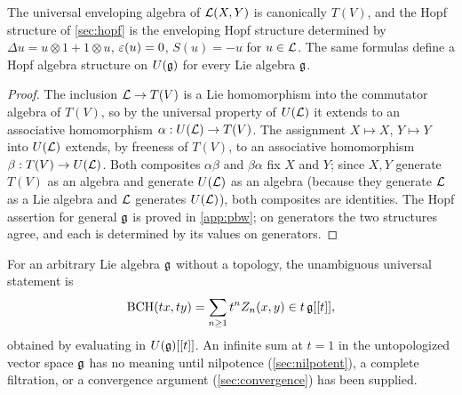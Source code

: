 \begin{proposition}\label{prop:enveloping}
The universal enveloping algebra of $\mathcal{L}(X,Y)$ is canonically $T(V)$, and
the Hopf structure of \cref{sec:hopf} is the enveloping Hopf structure
determined by $\Delta u=u\otimes1+1\otimes u$, $\varepsilon(u)=0$, $S(u)=-u$ for
$u\in\mathcal{L}$. The same formulas define a Hopf algebra structure on $U(\mathfrak{g})$ for
every Lie algebra $\mathfrak{g}$.
\end{proposition}
\begin{proof}
The inclusion $\mathcal{L}\to T(V)$ is a Lie homomorphism into the commutator
algebra of $T(V)$, so by the universal property of $U(\mathcal{L})$ it extends to an
associative homomorphism $\alpha:U(\mathcal{L})\to T(V)$. The assignment
$X\mapsto X$, $Y\mapsto Y$ into $U(\mathcal{L})$ extends, by freeness of $T(V)$, to
an associative homomorphism $\beta:T(V)\to U(\mathcal{L})$. Both composites
$\alpha\beta$ and $\beta\alpha$ fix $X$ and $Y$; since $X,Y$ generate
$T(V)$ as an algebra and generate $U(\mathcal{L})$ as an algebra (because they
generate $\mathcal{L}$ as a Lie algebra and $\mathcal{L}$ generates $U(\mathcal{L})$), both
composites are identities. The Hopf assertion for general $\mathfrak{g}$ is proved in
\cref{app:pbw}; on generators the two structures agree, and each is
determined by its values on generators.
\end{proof}
For an arbitrary Lie algebra $\mathfrak{g}$ without a topology, the unambiguous
universal statement is
\[
 \operatorname{BCH}(tx,ty)=\sum_{n\geq1}t^nZ_n(x,y)\in t\,\mathfrak{g}[[t]],
\]
obtained by evaluating in $U(\mathfrak{g})[[t]]$. An infinite sum at $t=1$ in the
untopologized vector space $\mathfrak{g}$ has no meaning until nilpotence
(\cref{sec:nilpotent}), a complete filtration, or a convergence argument
(\cref{sec:convergence}) has been supplied.
